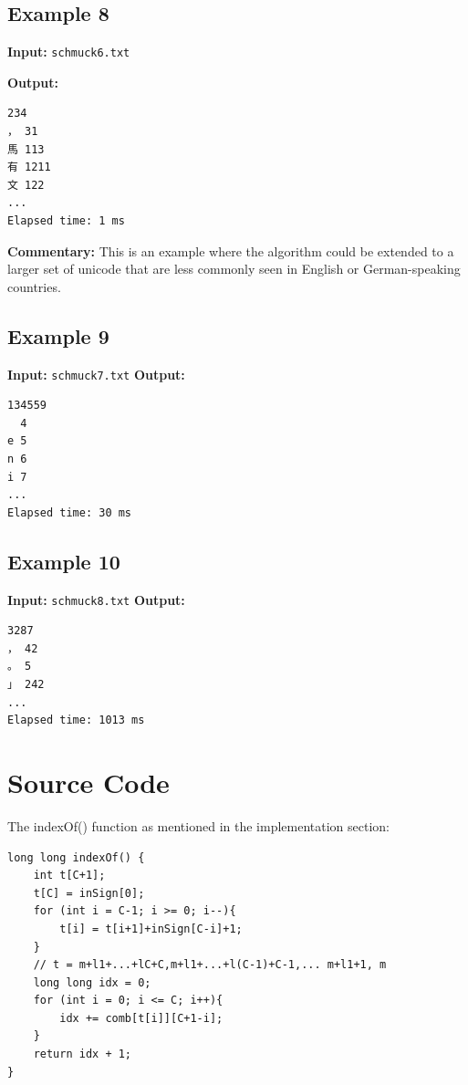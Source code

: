 \documentclass[a4paper,10pt,english]{scrartcl}
\newenvironment{cjktext}{}{}
\newenvironment{cjktext}{\begin{CJK}{UTF8}{bsmi}}{\end{CJK}}
\begin{document}
\subsection{Example 8}\label{ex:8}
\textbf{Input:} \texttt{schmuck6.txt}

\textbf{Output:}

\begin{cjktext}
\begin{verbatim}
234
， 31
馬 113
有 1211
文 122
...
Elapsed time: 1 ms
\end{verbatim}
\end{cjktext}

\textbf{Commentary:} This is an example where the algorithm could be extended to a larger set of unicode that are less commonly seen in English or German-speaking countries. 

\subsection{Example 9}\label{ex:9}
\textbf{Input:} \texttt{schmuck7.txt}
\textbf{Output:}

\begin{verbatim}
134559
  4
e 5
n 6
i 7
...
Elapsed time: 30 ms
\end{verbatim}

\subsection{Example 10}\label{ex:10}
\textbf{Input:} \texttt{schmuck8.txt}
\textbf{Output:}

\begin{cjktext}
\begin{verbatim}
3287
， 42
。 5
」 242
...
Elapsed time: 1013 ms
\end{verbatim}
\end{cjktext}


\section{Source Code}\label{sec:code}

The indexOf() function as mentioned in the implementation section:

\begin{lstlisting}
long long indexOf() {
    int t[C+1];
    t[C] = inSign[0];
    for (int i = C-1; i >= 0; i--){
        t[i] = t[i+1]+inSign[C-i]+1;
    }
    // t = m+l1+...+lC+C,m+l1+...+l(C-1)+C-1,... m+l1+1, m
    long long idx = 0;
    for (int i = 0; i <= C; i++){
        idx += comb[t[i]][C+1-i];
    }
    return idx + 1;
}
\end{lstlisting}
\end{document}
